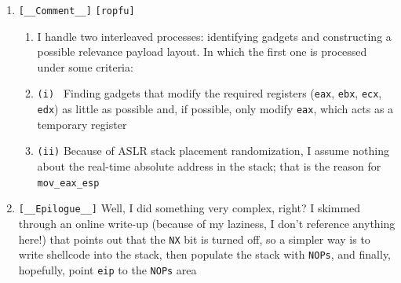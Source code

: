\documentclass[main.tex]{subfiles}
\begin{document}
\begin{minipage}[t]{0.49\textwidth}
	\setlength{\parskip}{0.4em}
	\userline
	
	\setlength{\parskip}{1em}
	\begin{enumerate}
		\setlength{\parskip}{0.9em}
		\item[\texttt{[\_]}] \texttt{[\_\_Comment\_\_]} \texttt{[ropfu]} 
		\begin{enumerate}[leftmargin=0pt, labelindent=0pt]
			\item[] I handle two interleaved processes: identifying gadgets and constructing a possible relevance payload layout. In which the first one is processed under some criteria:
			\item[] \texttt{(i) } Finding gadgets that modify the required registers (\texttt{eax}, \texttt{ebx}, \texttt{ecx}, \texttt{edx}) as little as possible and, if possible, only modify \texttt{eax}, which acts as a temporary register
			\item[] \texttt{(ii)} Because of ASLR stack placement randomization, I assume nothing about the real-time absolute address in the stack; that is the reason for \texttt{mov\_eax\_esp}
		\end{enumerate}
		\setlength{\parskip}{1em}
		\item[\texttt{[\_]}] \texttt{[\_\_Epilogue\_\_]} Well, I did something very complex, right? I skimmed through an online write-up (because of my laziness, I don’t reference anything here!) that points out that the \texttt{NX} bit is turned off, so a simpler way is to write shellcode into the stack, then populate the stack with \texttt{NOPs}, and finally, hopefully, point \texttt{eip} to the \texttt{NOPs} area
	\end{enumerate}
\end{minipage}
\hfill
\end{document}
